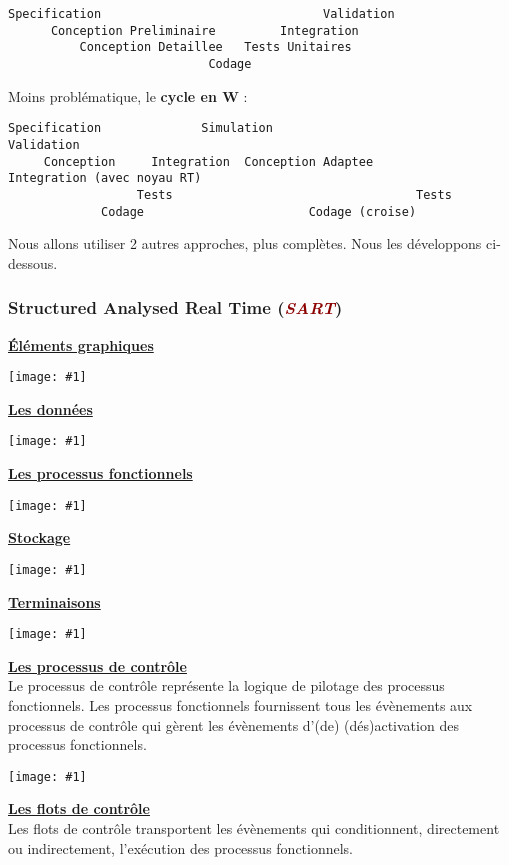 \documentclass{article}
\newcommand{\red}[1]{\textcolor{darkred}{#1}}
\newcommand{\imgR}[2]{\begin{center}\texttt{[image: \#1]}\end{center}}
\newcommand{\stitre}[1]{\noindent\textbf{\underline{#1}} \\}
\begin{document}
\begin{lstlisting}
Specification                               Validation
      Conception Preliminaire         Integration
          Conception Detaillee   Tests Unitaires
                            Codage
\end{lstlisting}

Moins problématique, le \textbf{cycle en W} :

\begin{lstlisting}
Specification              Simulation                            Validation
     Conception     Integration  Conception Adaptee         Integration (avec noyau RT)
                  Tests                                  Tests
             Codage                       Codage (croise)
\end{lstlisting}

Nous allons utiliser 2 autres approches, plus complètes. Nous les développons ci-dessous.

\subsubsection{Structured Analysed Real Time (\textit{\red{SART}})}

\stitre{\'{E}léments graphiques}

\imgR{ITR_001.png}{400}

\stitre{Les données}

\imgR{ITR_002.png}{400}

\stitre{Les processus fonctionnels}

\imgR{ITR_003.png}{150}

\stitre{Stockage}

\imgR{ITR_004.png}{400}

\stitre{Terminaisons}

\imgR{ITR_005.png}{300}

\stitre{Les processus de contrôle}

Le processus de contrôle représente la logique de pilotage des processus fonctionnels. Les processus fonctionnels 
fournissent tous les évènements aux processus de contrôle qui gèrent les évènements d'(de) (dés)activation des
processus fonctionnels.

\imgR{ITR_006.png}{75}

\stitre{Les flots de contrôle}

Les flots de contrôle transportent les évènements qui conditionnent, directement ou indirectement, l’exécution 
des processus fonctionnels.
\end{document}
